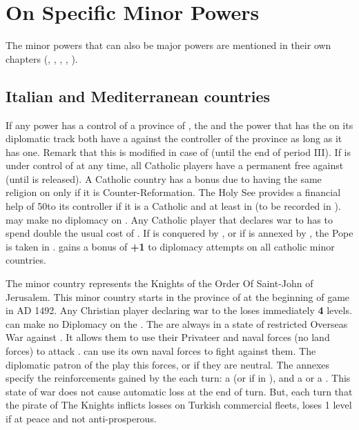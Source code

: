 \section{On Specific Minor Powers}
The minor powers that can also be major powers are mentioned in their
own chapters (, ,
, , ).

\subsection{Italian and Mediterranean countries}\label{chSpecific:Italy}

\label{chSpecific:Papacy}
\aparag If any power has a control of a province of , the
 and the power that has the
 on its diplomatic track both have a \CB against the
controller of the province as long as it has one.
\bparag Remark that this is modified in case of  (until
the end of period III).
\bparag If  is under control of \TUR at any time, all
Catholic players have a permanent free \CB against \TUR (until
 is released).
\aparag[Diplomacy]
\bparag A Catholic country has a bonus due to having the same religion
on  only if it is Counter-Reformation.
\label{chSpecific:Papacy:Gold} The Holy See provides
a financial help of 50\ducats to its controller if it is a Catholic and
at least in \MA (to be recorded in ).
\bparag \TUR may make no diplomacy on .
\bparag Any Catholic player that declares war to  has to
spend double the usual cost of \STAB.
 If  is conquered by \TUR, or if
 is annexed by \VEN, the Pope is taken in
. \VEN gains a bonus of {\bf +1} to diplomacy attempts on
all catholic minor countries.

\label{chSpecific:Knights}
The  minor country represents the Knights of the Order
Of Saint-John of Jerusalem. This minor country starts in the province of
 at the beginning of game in AD 1492.
\aparag[Diplomacy] Any Christian player declaring war to the
 loses immediately {\bf 4} \STAB levels.
\bparag \TUR can make no Diplomacy on the .
 The  are always in a
state of restricted Overseas War against \TUR.
\bparag It allows them to use their Privateer and naval forces (no land
forces) to attack \TUR. \TUR can use its own naval forces to fight
against them.
\bparag The diplomatic patron of the  play this forces,
or \SPA if they are neutral.
\bparag The annexes specify the reinforcements gained by the
 each turn: a \corsaire\facemoins (or \Faceplus if in
), and a \NGD or a \NDE.
\bparag This state of war does not cause automatic \STAB loss at the end
of turn.  But, each turn that the pirate of The Knights inflicts losses
on Turkish commercial fleets, \TUR loses 1 \STAB level if at peace and
not anti-prosperous.

